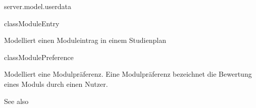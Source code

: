 \begin{texdocpackage}{server.model.userdata}
\label{texdoclet:edu.kit.informatik.studyplan.server.model.userdata}

\begin{texdocclass}{class}{ModuleEntry}
\label{texdoclet:edu.kit.informatik.studyplan.server.model.userdata.ModuleEntry}
\begin{texdocclassintro}
Modelliert einen Moduleintrag in einem Studienplan\end{texdocclassintro}
\begin{texdocclassconstructors}
\end{texdocclassconstructors}
\begin{texdocclassmethods}
\end{texdocclassmethods}
\end{texdocclass}


\begin{texdocclass}{class}{ModulePreference}
\label{texdoclet:edu.kit.informatik.studyplan.server.model.userdata.ModulePreference}
\begin{texdocclassintro}
Modelliert eine Modulpräferenz. 
 Eine Modulpräferenz bezeichnet die Bewertung eines Moduls durch einen Nutzer.\end{texdocclassintro}
\begin{texdocclassconstructors}
\end{texdocclassconstructors}
\begin{texdocclassmethods}
\begin{texdocsees}{See also}
\end{texdocsees}


\end{texdocclassmethods}
\end{texdocclass}
\end{texdocpackage}
